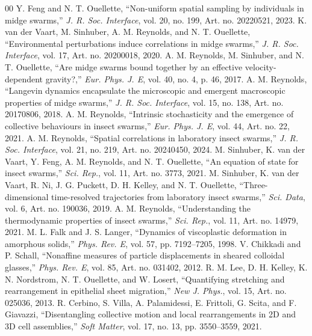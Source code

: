 \begin{thebibliography}{00}
 Y. Feng and N. T. Ouellette, ``Non-uniform spatial sampling by individuals in midge swarms,'' \textit{J. R. Soc. Interface}, vol. 20, no. 199, Art. no. 20220521, 2023.
 K. van der Vaart, M. Sinhuber, A. M. Reynolds, and N. T. Ouellette, ``Environmental perturbations induce correlations in midge swarms,'' \textit{J. R. Soc. Interface}, vol. 17, Art. no. 20200018, 2020.
 A. M. Reynolds, M. Sinhuber, and N. T. Ouellette, ``Are midge swarms bound together by an effective velocity-dependent gravity?,'' \textit{Eur. Phys. J. E}, vol. 40, no. 4, p. 46, 2017.
 A. M. Reynolds, ``Langevin dynamics encapsulate the microscopic and emergent macroscopic properties of midge swarms,'' \textit{J. R. Soc. Interface}, vol. 15, no. 138, Art. no. 20170806, 2018.
 A. M. Reynolds, ``Intrinsic stochasticity and the emergence of collective behaviours in insect swarms,'' \textit{Eur. Phys. J. E}, vol. 44, Art. no. 22, 2021.
 A. M. Reynolds, ``Spatial correlations in laboratory insect swarms,'' \textit{J. R. Soc. Interface}, vol. 21, no. 219, Art. no. 20240450, 2024.
 M. Sinhuber, K. van der Vaart, Y. Feng, A. M. Reynolds, and N. T. Ouellette, ``An equation of state for insect swarms,'' \textit{Sci. Rep.}, vol. 11, Art. no. 3773, 2021.
 M. Sinhuber, K. van der Vaart, R. Ni, J. G. Puckett, D. H. Kelley, and N. T. Ouellette, ``Three-dimensional time-resolved trajectories from laboratory insect swarms,'' \textit{Sci. Data}, vol. 6, Art. no. 190036, 2019.
 A. M. Reynolds, ``Understanding the thermodynamic properties of insect swarms,'' \textit{Sci. Rep.}, vol. 11, Art. no. 14979, 2021.
 M. L. Falk and J. S. Langer, ``Dynamics of viscoplastic deformation in amorphous solids,'' \textit{Phys. Rev. E}, vol. 57, pp. 7192--7205, 1998.
 V. Chikkadi and P. Schall, ``Nonaffine measures of particle displacements in sheared colloidal glasses,'' \textit{Phys. Rev. E}, vol. 85, Art. no. 031402, 2012.
 R. M. Lee, D. H. Kelley, K. N. Nordstrom, N. T. Ouellette, and W. Losert, ``Quantifying stretching and rearrangement in epithelial sheet migration,'' \textit{New J. Phys.}, vol. 15, Art. no. 025036, 2013.
 R. Cerbino, S. Villa, A. Palamidessi, E. Frittoli, G. Scita, and F. Giavazzi, ``Disentangling collective motion and local rearrangements in 2D and 3D cell assemblies,'' \textit{Soft Matter}, vol. 17, no. 13, pp. 3550--3559, 2021.

\end{thebibliography}
